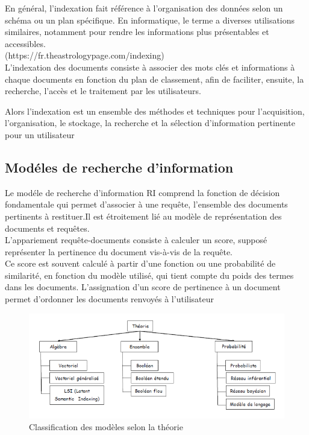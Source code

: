 \documentclass[12pt]{report}
\begin{document}
En général, l'indexation fait référence à l'organisation des données selon un schéma ou un plan spécifique. En informatique, le terme a diverses utilisations similaires, notamment pour rendre les informations plus présentables et accessibles.
\\(https://fr.theastrologypage.com/indexing)\\

L'indexation des documents consiste à associer des mots clés et informations à chaque documents en fonction du plan de classement, afin de faciliter, ensuite, la recherche, l’accès et le traitement par les utilisateurs.

Alors l’indexation est un ensemble des méthodes et techniques pour l’acquisition, l’organisation, le stockage, la recherche et la sélection d’information pertinente pour un utilisateur


\subsection{Modéles de recherche d'information}

Le modéle de recherche d'information RI comprend la fonction de décision fondamentale qui permet
d’associer à une requête, l’ensemble des documents pertinents
à restituer.Il est étroitement lié au modèle de représentation des
documents et requêtes.\\
L’appariement requête-documents consiste à calculer un score,
supposé représenter la pertinence du document vis-à-vis de la
requête.\\
Ce score est souvent calculé à partir d’une fonction ou une
probabilité de similarité, en fonction du modèle utilisé, qui tient
compte du poids des termes dans les documents.
L’assignation d’un score de pertinence à un document permet
d’ordonner les documents renvoyés à l’utilisateur

\begin{figure}[h]
    \centering
    \includegraphics[width=1\textwidth]{indexation}
    \caption{Classification des modèles selon la théorie}
    \label{fig:mesh2}
\end{figure}
\end{document}
